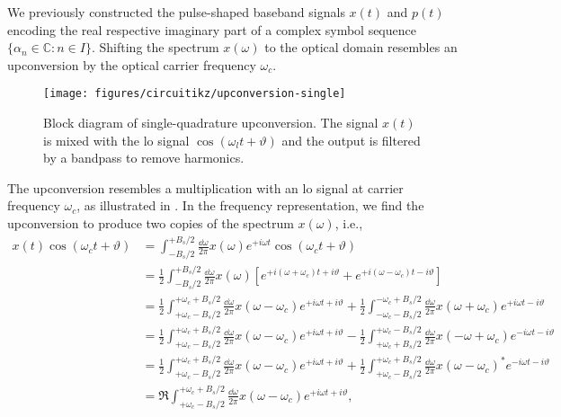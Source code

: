 We previously constructed the pulse-shaped baseband signals $x(t)$ and $p(t)$ encoding the real respective imaginary part of a complex symbol sequence $\{\alpha_n\in\mathbb{C}\colon n\in I\}$.
Shifting the spectrum $x(\omega)$ to the optical domain resembles an upconversion by the optical carrier frequency $\omega_c$.
\begin{figure}[htb]
	\centering
	\texttt{[image: figures/circuitikz/upconversion-single]}
	\caption{Block diagram of single-quadrature upconversion. The signal $x(t)$ is mixed with the \gls{lo} signal $\cos(\omega_lt+\vartheta)$ and the output is filtered by a bandpass to remove harmonics.}\label{fig:upconversion_single}
\end{figure}
The upconversion resembles a multiplication with an \gls{lo} signal at carrier frequency $\omega_c$, as illustrated in .
In the frequency representation, we find the upconversion to produce two copies of the spectrum $x(\omega)$, i.e.,
\begin{equation}
	\begin{split}
		x(t)
		\cos(\omega_ct+\vartheta)
		&=
		\int_{-B_s/2}^{+B_s/2}
		\frac{\dd{\omega}}{2\pi}
		x(\omega)
		e^{+i\omega t}
		\cos(\omega_ct+\vartheta)
		\\
		&=
		\frac{1}{2}
		\int_{-B_s/2}^{+B_s/2}
		\frac{\dd{\omega}}{2\pi}
		x(\omega)
		\left[
			e^{+i(\omega+\omega_c)t+i\vartheta}
			+
			e^{+i(\omega-\omega_c)t-i\vartheta}
		\right]
		\\
		&=
		\frac{1}{2}
		\int_{+\omega_c-B_s/2}^{+\omega_c+B_s/2}
		\frac{\dd{\omega}}{2\pi}
		x(\omega-\omega_c)
		e^{+i\omega t+i\vartheta}
		+
		\frac{1}{2}
		\int_{-\omega_c-B_s/2}^{-\omega_c+B_s/2}
		\frac{\dd{\omega}}{2\pi}
		x(\omega+\omega_c)
		e^{+i\omega t-i\vartheta}
		\\
		&=
		\frac{1}{2}
		\int_{+\omega_c-B_s/2}^{+\omega_c+B_s/2}
		\frac{\dd{\omega}}{2\pi}
		x(\omega-\omega_c)
		e^{+i\omega t+i\vartheta}
		-
		\frac{1}{2}
		\int_{+\omega_c+B_s/2}^{+\omega_c-B_s/2}
		\frac{\dd{\omega}}{2\pi}
		x(-\omega+\omega_c)
		e^{-i\omega t-i\vartheta}
		\\
		&=
		\frac{1}{2}
		\int_{+\omega_c-B_s/2}^{+\omega_c+B_s/2}
		\frac{\dd{\omega}}{2\pi}
		x(\omega-\omega_c)
		e^{+i\omega t+i\vartheta}
		+
		\frac{1}{2}
		\int_{+\omega_c-B_s/2}^{+\omega_c+B_s/2}
		\frac{\dd{\omega}}{2\pi}
		x(\omega-\omega_c)^*
		e^{-i\omega t-i\vartheta}
		\\
		&=
		\Re\int_{+\omega_c-B_s/2}^{+\omega_c+B_s/2}
		\frac{\dd{\omega}}{2\pi}
		x(\omega-\omega_c)
		e^{+i\omega t+i\vartheta}
		,
	\end{split}
	\label{eq:upconversion_real}
\end{equation}
